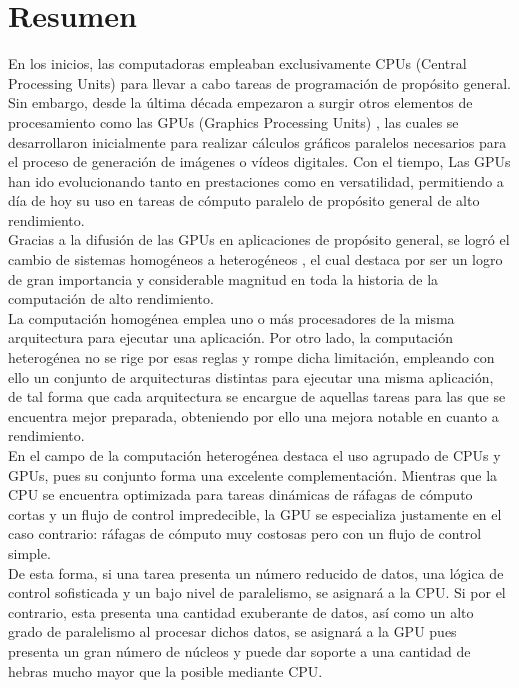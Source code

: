 \section{Resumen}
En los inicios, las computadoras empleaban exclusivamente CPUs (Central Processing Units) \cite{CPU_definicion} para llevar a cabo tareas de programación de propósito general. Sin embargo, desde la última década empezaron a surgir otros elementos de procesamiento como las GPUs (Graphics Processing Units) \cite{GPU_definicion}, las cuales se desarrollaron inicialmente para realizar cálculos gráficos paralelos necesarios para el proceso de generación de imágenes o vídeos digitales. Con el tiempo, Las GPUs han ido evolucionando tanto en prestaciones como en versatilidad, permitiendo a día de hoy su uso en tareas de cómputo paralelo de propósito general de alto rendimiento. \\
Gracias a la difusión de las GPUs en aplicaciones de propósito general, se logró el cambio de sistemas homogéneos a heterogéneos \cite{sitemas_heterogeneo_definicion}, el cual destaca por ser un logro de gran importancia y considerable magnitud en toda la historia de la computación de alto rendimiento. \\
La computación homogénea emplea uno o más procesadores de la misma arquitectura para ejecutar una aplicación. Por otro lado, la computación heterogénea no se rige por esas reglas y rompe dicha limitación, empleando con ello un conjunto de arquitecturas distintas para ejecutar una misma aplicación, de tal forma que cada arquitectura se encargue de aquellas tareas para las que se encuentra mejor preparada, obteniendo por ello una mejora notable en cuanto a rendimiento. \\
En el campo de la computación heterogénea destaca el uso agrupado de CPUs y GPUs, pues su conjunto forma una excelente complementación. Mientras que la CPU se encuentra optimizada para tareas dinámicas de ráfagas de cómputo cortas y un flujo de control impredecible, la GPU se especializa justamente en el caso contrario: ráfagas de cómputo muy costosas pero con un flujo de control simple. \\
De esta forma, si una tarea presenta un número reducido de datos, una lógica de control sofisticada y un bajo nivel de paralelismo, se asignará a la CPU. Si por el contrario, esta presenta una cantidad exuberante de datos, así como un alto grado de paralelismo al procesar dichos datos, se asignará a la GPU pues presenta un gran número de núcleos y puede dar soporte a una cantidad de hebras mucho mayor que la posible mediante CPU. \cite{Professional_CUDA_C} \\
